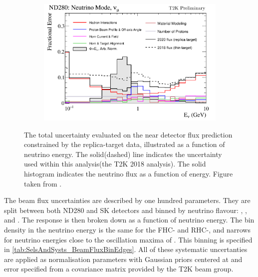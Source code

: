 \begin{figure}[h]
  \begin{subfigure}[t]{\textwidth}
    \includegraphics[width=\textwidth, trim={0mm 0mm 0mm 0mm}, clip,page=1]{Figures/Selections/flux_uncertainty_covariance_plots_addcorrnd_compwv3_flux_error_t2k_nd5_fhc_numu.pdf}
  \end{subfigure}
  \caption{The total uncertainty evaluated on the near detector \quickmath{\nu_{\mu}} flux prediction constrained by the replica-target data, illustrated as a function of neutrino energy. The solid(dashed) line indicates the uncertainty used within this analysis(the T2K 2018 analysis). The solid histogram indicates the neutrino flux as a function of energy. Figure taken from \cite{t2k_tn_354}.}
  \label{fig:SelsAndSysts_BeamFluxSysts}
\end{figure}

The beam flux uncertainties are described by one hundred parameters. They are split between both ND280 and SK detectors and binned by neutrino flavour: \quickmath{\nu_{\mu}}, \quickmath{\bar{\nu}_{\mu}},  and . The response is then broken down as a function of neutrino energy. The bin density in the neutrino energy is the same for the FHC-\quickmath{\nu_{\mu}} and RHC-\quickmath{\bar{\nu}_{\mu}}, and narrows for neutrino energies close to the oscillation maxima of . This binning is specified in \autoref{tab:SelsAndSysts_BeamFluxBinEdges}. All of these systematic uncertanties are applied as normalisation parameters with Gaussian priors centered at  and error specified from a covariance matrix provided by the T2K beam group.

